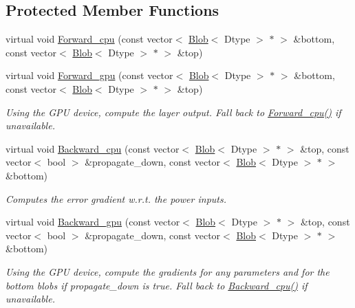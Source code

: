 \subsection*{Protected Member Functions}
\begin{DoxyCompactItemize}
\item 
virtual void \hyperlink{classcaffe_1_1PowerLayer_a35131891dc10f9092ec6dcd115fdb71b}{Forward\+\_\+cpu} (const vector$<$ \hyperlink{classcaffe_1_1Blob}{Blob}$<$ Dtype $>$ $\ast$ $>$ \&bottom, const vector$<$ \hyperlink{classcaffe_1_1Blob}{Blob}$<$ Dtype $>$ $\ast$ $>$ \&top)
\item 
virtual void \hyperlink{classcaffe_1_1PowerLayer_ae942bd168cb49fb02b4d60a4aa2a0e64}{Forward\+\_\+gpu} (const vector$<$ \hyperlink{classcaffe_1_1Blob}{Blob}$<$ Dtype $>$ $\ast$ $>$ \&bottom, const vector$<$ \hyperlink{classcaffe_1_1Blob}{Blob}$<$ Dtype $>$ $\ast$ $>$ \&top)\hypertarget{classcaffe_1_1PowerLayer_ae942bd168cb49fb02b4d60a4aa2a0e64}{}\label{classcaffe_1_1PowerLayer_ae942bd168cb49fb02b4d60a4aa2a0e64}

\begin{DoxyCompactList}\small\item\em Using the G\+PU device, compute the layer output. Fall back to \hyperlink{classcaffe_1_1PowerLayer_a35131891dc10f9092ec6dcd115fdb71b}{Forward\+\_\+cpu()} if unavailable. \end{DoxyCompactList}\item 
virtual void \hyperlink{classcaffe_1_1PowerLayer_a1eebf9d5152fc5926a051c9c97eba27e}{Backward\+\_\+cpu} (const vector$<$ \hyperlink{classcaffe_1_1Blob}{Blob}$<$ Dtype $>$ $\ast$ $>$ \&top, const vector$<$ bool $>$ \&propagate\+\_\+down, const vector$<$ \hyperlink{classcaffe_1_1Blob}{Blob}$<$ Dtype $>$ $\ast$ $>$ \&bottom)
\begin{DoxyCompactList}\small\item\em Computes the error gradient w.\+r.\+t. the power inputs. \end{DoxyCompactList}\item 
virtual void \hyperlink{classcaffe_1_1PowerLayer_a4471782e2f899cf2eaa5e47df2ea850e}{Backward\+\_\+gpu} (const vector$<$ \hyperlink{classcaffe_1_1Blob}{Blob}$<$ Dtype $>$ $\ast$ $>$ \&top, const vector$<$ bool $>$ \&propagate\+\_\+down, const vector$<$ \hyperlink{classcaffe_1_1Blob}{Blob}$<$ Dtype $>$ $\ast$ $>$ \&bottom)\hypertarget{classcaffe_1_1PowerLayer_a4471782e2f899cf2eaa5e47df2ea850e}{}\label{classcaffe_1_1PowerLayer_a4471782e2f899cf2eaa5e47df2ea850e}

\begin{DoxyCompactList}\small\item\em Using the G\+PU device, compute the gradients for any parameters and for the bottom blobs if propagate\+\_\+down is true. Fall back to \hyperlink{classcaffe_1_1PowerLayer_a1eebf9d5152fc5926a051c9c97eba27e}{Backward\+\_\+cpu()} if unavailable. \end{DoxyCompactList}\end{DoxyCompactItemize}
